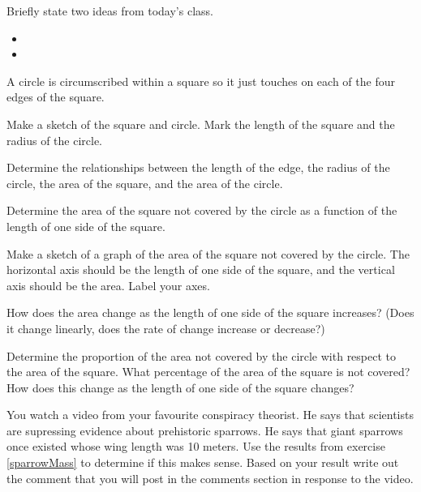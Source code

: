 \begin{problem}
\item Briefly state two ideas from today's class.
  \begin{itemize}
  \item
  \item
  \end{itemize}
\item A circle is circumscribed within a square so it just touches on
  each of the four edges of the square.
  \begin{subproblem}
    \item Make a sketch of the square and circle. Mark the length of
      the square and the radius of the circle.
    \item Determine the relationships between the length of the edge,
      the radius of the circle, the area of the square, and the area
      of the circle.
    \item Determine the area of the square not covered by the circle
      as a function of the length of one side of the square.
    \item Make a sketch of a graph of the area of the square not
      covered by the circle. The horizontal axis should be the length
      of one side of the square, and the vertical axis should be the
      area. Label your axes.
    \item How does the area change as the length of one side of the
      square increases? (Does it change linearly, does the rate of
      change increase or decrease?)
    \item Determine the proportion of the area not covered by the
      circle with respect to the area of the square. What percentage
      of the area of the square is not covered? How does this change
      as the length of one side of the square changes?
  \end{subproblem}
  \item You watch a video from your favourite conspiracy theorist.
    He says that scientists are supressing evidence about prehistoric sparrows.
    He says that giant sparrows once existed whose wing length was 10 meters.
    Use the results from exercise \ref{sparrowMass} to determine if this makes sense.
    Based on your result write out the comment that you will post in the comments
    section in response to the video.

\end{problem}



